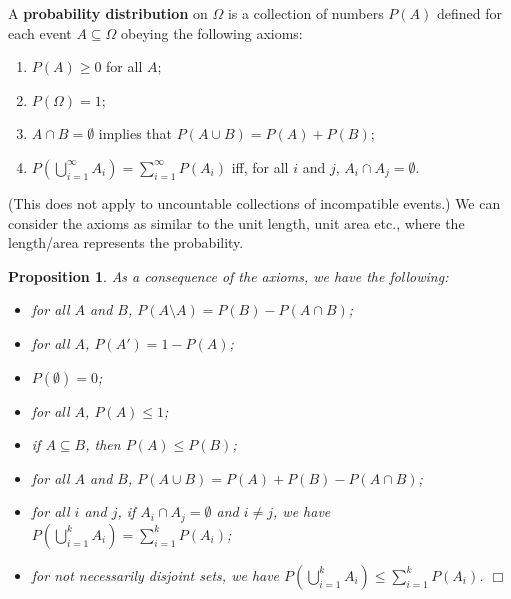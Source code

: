 \documentclass[letter-paper]{tufte-book}
\newtheorem{proposition}[theorem]{\color{pastel-blue}Proposition}
\newcommand\Def[1]{\textbf{#1}}
\newcommand{\qedwhite}{\hfill \ensuremath{\Box}}
\begin{document}
A \Def{probability distribution} on $\Omega$ is a collection of numbers
$P(A)$ defined for each event $A\subseteq\Omega$ obeying the following axioms:
\begin{enumerate}
  \item $P(A)\geq 0$ for all $A$;
  \item $P(\Omega)=1$;
  \item $A\cap B=\emptyset$ implies that $P(A\cup B)=P(A)+P(B)$;
  \item $P\left(\bigcup_{i=1}^\infty A_i\right)=\sum_{i=1}^\infty P(A_i)$ iff,
  for all $i$ and $j$, $A_i \cap A_j=\emptyset$.
\end{enumerate}
(This does not apply to uncountable collections of incompatible events.) We can
consider the axioms as similar to the unit length, unit area etc., where the
length/area represents the probability.
\begin{proposition}
  As a consequence of the axioms, we have the following:
  \begin{itemize}
    \item for all $A$ and $B$, $P(A\setminus A)=P(B)-P(A\cap B)$;
    \item for all $A$, $P(A')=1-P(A)$;
    \item $P(\emptyset)=0$;
    \item for all $A$, $P(A)\leq 1$;
    \item if $A\subseteq B$, then $P(A)\leq P(B)$;
    \item for all $A$ and $B$, $P(A\cup B)=P(A)+P(B)-P(A\cap B)$;
    \item for all $i$ and $j$, if $A_i \cap A_j=\emptyset$ and $i\neq j$, we
    have $P\left(\bigcup_{i=1}^k A_i\right)=\sum_{i=1}^k P(A_i)$;
    \item for not necessarily disjoint sets, we have $P\left(\bigcup_{i=1}^k
    A_i\right)\leq\sum_{i=1}^k P(A_i)$. \qedwhite
  \end{itemize}
\end{proposition}
\end{document}
